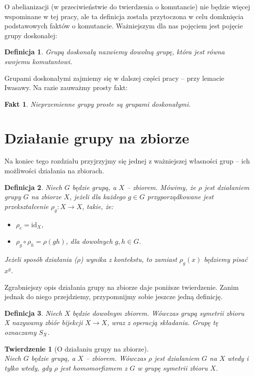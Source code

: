 \documentclass[licencjacka]{pracamgr}
\newtheorem{deff}{Definicja}[section]
\newtheorem{thh}{Twierdzenie}[section]
\newtheorem{fact}{Fakt}[section]
\begin{document}
O abelianizacji (w przeciwieństwie do twierdzenia o komutancie) nie będzie więcej wspominane w tej pracy, 
ale ta definicja została przytoczona w celu domknięcia podstawowych faktów o komutancie.
Ważniejszym dla nas pojęciem jest pojęcie grupy doskonałej:

\begin{deff}
	\emph{Grupą doskonałą} nazwiemy dowolną grupę, która jest równa swojemu komutantowi.
\end{deff}

Grupami doskonałymi zajmiemy się w dalszej części pracy -- przy lemacie Iwasawy.
Na razie zauważmy prosty fakt:

\begin{fact}
	Nieprzemienne grupy proste są grupami doskonałymi.
\end{fact}


\section{Działanie grupy na zbiorze}
Na koniec tego rozdziału przyjrzyjmy się jednej z ważniejszej własności grup -- ich możliwości działania na zbiorach.

\begin{deff}
 	Niech $G$ będzie grupą, a $X$ -- zbiorem. Mówimy, że \emph{$\rho$ jest działaniem grupy $G$ na zbiorze $X$}, 
	jeżeli dla każdego $g \in G$ przyporządkowane jest przekształcenie $\rho_g\colon X \to X$, takie, że:
	\begin{itemize}
		\item $\rho_e = \mathrm{id}_X$,
		\item $\rho_g \circ \rho_h = \rho(gh)$, dla dowolnych $g, h \in G$.
	\end{itemize}
	Jeżeli sposób działania ($\rho$) wynika z kontekstu, to zamiast $\rho_g(x)$ będziemy pisać $x^g$.
\end{deff}

Zgrabniejszy opis działania grupy na zbiorze daje poniższe twierdzenie.
Zanim jednak do niego przejdziemy, przypomnijmy sobie jeszcze jedną definicję.

\begin{deff}
	Niech $X$ będzie dowolnym zbiorem. Wówczas \emph{grupą symetrii zbioru X} nazywamy zbiór bijekcji $X \to X$,
	wraz z operacją składania. Grupę tę oznaczamy $S_X$.
\end{deff}

\begin{thh}[O działaniu grupy na zbiorze] $ $ \\
	Niech $G$ będzie grupą, a $X$ -- zbiorem. Wówczas $\rho$ jest działaniem $G$ na $X$ wtedy i tylko wtedy, 
	gdy $\rho$ jest homomorfizmem z $G$ w grupę symetrii zbioru $X$.
\end{thh}
\end{document}
